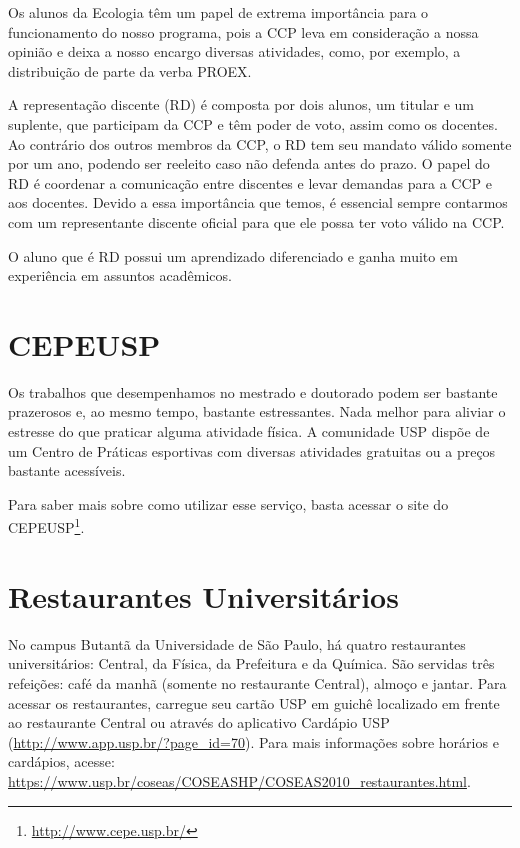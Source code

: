 Os alunos da Ecologia têm um papel de extrema importância para o
funcionamento do nosso programa, pois a CCP leva em consideração a
nossa opinião e deixa a nosso encargo diversas atividades, como, por
exemplo, a distribuição de parte da verba PROEX.

A representação discente (RD) é composta por dois alunos, um titular e
um suplente, que participam da CCP e têm poder de voto, assim como os
docentes. Ao contrário dos outros membros da CCP, o RD tem seu mandato
válido somente por um ano, podendo ser reeleito caso não defenda antes
do prazo. O papel do RD é coordenar a comunicação entre discentes e
levar demandas para a CCP e aos docentes. Devido a essa importância
que temos, é essencial sempre contarmos com um representante discente
oficial para que ele possa ter voto válido na CCP.

O aluno que é RD possui um aprendizado diferenciado e ganha muito em
experiência em assuntos acadêmicos.

\section{CEPEUSP}\label{cepeusp}

Os trabalhos que desempenhamos no mestrado e doutorado podem ser
bastante prazerosos e, ao mesmo tempo, bastante estressantes. Nada
melhor para aliviar o estresse do que praticar alguma atividade
física. A comunidade USP dispõe de um Centro de Práticas esportivas
com diversas atividades gratuitas ou a preços bastante acessíveis.

Para saber mais sobre como utilizar esse serviço, basta acessar o site do
CEPEUSP\footnote{\url{http://www.cepe.usp.br/}}.

\section{Restaurantes Universitários}\label{Restaurantes Universitários}

No campus Butantã da Universidade de São Paulo, há quatro restaurantes
universitários: Central, da Física, da Prefeitura e da Química. São
servidas três refeições: café da manhã (somente no restaurante
Central), almoço e jantar. Para acessar os restaurantes, carregue seu
cartão USP em guichê localizado em frente ao restaurante Central ou
através do aplicativo Cardápio USP
({\url{http://www.app.usp.br/?page_id=70}}). Para mais informações
sobre horários e cardápios, acesse:
{\url{https://www.usp.br/coseas/COSEASHP/COSEAS2010_restaurantes.html}}.
